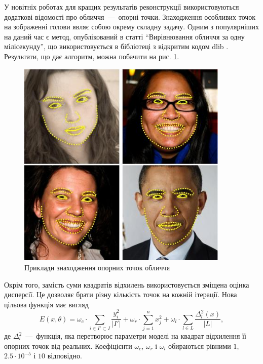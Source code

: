 У новітніх роботах для кращих результатів реконструкції використовуються
додаткові відомості про обличчя~---~опорні точки.
Знаходження особливих точок на зображенні голови
являє собою окрему складну задачу.
Одним з популярніших на даний час є метод, опублікований в статті
``Вирівнювання обличчя за одну мілісекунду'',
що використовується в бібліотеці з відкритим кодом dlib \cite{Kazemi:2014}.
Результати, що дає алгоритм, можна побачити на рис. \ref{fig:problems:dlib}.
\begin{figure}[h]
  \centering
    \includegraphics[width=0.9\textwidth]{images/dlib}
  \caption{Приклади знаходження опорних точок обличчя}
  \label{fig:problems:dlib}
\end{figure}

Окрім того,
замість суми квадратів відхилень використовується зміщена оцінка дисперсії.
Це дозволяє брати різну кількість точок на кожній ітерації.
Нова цільова функція має вигляд
\begin{equation}\label{eq:energy:face2face}
  E\left( x, \theta \right)
  = \omega_c \cdot \sum_{i \in I' \subset I} \frac{y_i^2}{\left| I' \right|}
  + \omega_r \cdot \sum_{j = 1}^{n} x_j^2
  + \omega_l \cdot \sum_{l \in L} \frac{\Delta_l^2\left( x \right)}
                                       {\left| L \right|},
\end{equation}
де $\Delta_l^2$~---~функція,
яка перетворює параметри моделі
на квадрат відхилення її опорних точок від реальних.
Коефіцієнти $\omega_c$, $\omega_r$ і $\omega_l$
обираються рівними $1$, $2.5 \cdot 10^{-5}$ і $10$ відповідно.
